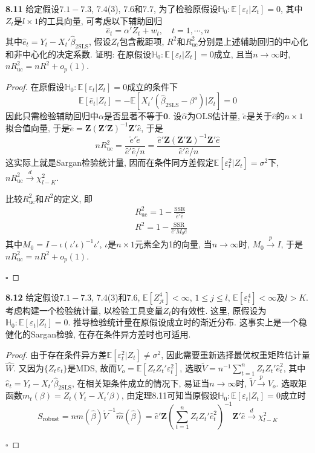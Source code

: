 \documentclass[cn,12pt,math=mtpro2,citestyle=gb7714-2015,bibstyle=gb7714-2015,twocol,mode=simple]{elegantbook}
\newcommand{\HH}{\mathbb{H}}
\newcommand{\E}{\mathbb{E}}
\newcommand{\hbeta}{\hat{\beta}}
\newcommand{\btls}{\hat{\beta}_{\text{2SLS}}}
\newcommand{\hatm}{\hat{m}}
\begin{document}
\textbf{8.11} 给定假设$7.1-7.3$, 7.4(3), 7.6和7.7, 为了检验原假设$\HH_0: \E[\varepsilon_t|Z_t]=0$, 其中$Z_t$是$l\times1$的工具向量, 可考虑以下辅助回归
$$\hat{e}_t=\alpha'Z_t+w_t,\quad t=1,\cdots,n$$
其中$\hat{e}_t=Y_t-X_t'\btls$, 假设$Z_t$包含截距项, $R^2$和$R_{\text{uc}}^2$分别是上述辅助回归的中心化和非中心化的决定系数. 证明: 在原假设$\HH_0: \E[\varepsilon_t|Z_t]=0$成立, 且当$n\to\infty$时, $nR_{\text{uc}}^2=nR^2+o_p(1)$.

\begin{proof}
  在原假设$\HH_0:\E[\varepsilon_t|Z_t]=0$成立的条件下
  $$\E[\hat{e}_t|Z_t]=-\E[X_t'(\btls-\beta^o)|Z_t]=0$$
  因此只需检验辅助回归中$\alpha$是否显著不等于$\mathbf{0}$. 设$\hat{\alpha}$为OLS估计量, $\tilde{e}$是关于$\hat{e}$的$n\times 1$拟合值向量, 于是$\tilde{e}=\mathbf{Z}(\mathbf{Z}'\mathbf{Z})^{-1}\mathbf{Z}'\hat{e}$, 于是
  $$nR_{\text{uc}}^2=\frac{\tilde{e}'\tilde{e}}{\hat{e}'\hat{e}/n}=\frac{\hat{e}'\mathbf{Z}(\mathbf{Z}'\mathbf{Z})^{-1}\mathbf{Z}'\hat{e}}{\hat{e}'\hat{e}/n}$$
  这实际上就是Sargan检验统计量, 因而在条件同方差假定$\E[\varepsilon_t^2|Z_t]=\sigma^2$下, $nR_{\text{uc}}^2\xrightarrow{d}\chi^2_{l-K}$.

  比较$R_{\text{uc}}^2$和$R^2$的定义, 即
  \begin{align*}
  &R_{\text{uc}}^2=1-\frac{\text{SSR}}{\hat{e}'\hat{e}} \\
  &R^2=1-\frac{\text{SSR}}{\hat{e}'M_0\hat{e}}
  \end{align*}
  其中$M_0=I-\iota(\iota'\iota)^{-1}\iota'$, $\iota$是$n\times 1$元素全为1的向量, 当$n\to\infty$时, $M_0\xrightarrow{p} I$, 于是$nR_{\text{uc}}^2=nR^2+o_p(1)$.

  $\square$
\end{proof}

\textbf{8.12} 给定假设$7.1-7.3$, 7.4(3)和7.6, $\E[Z_{jt}^4]<\infty$, $1\leq j\leq l$, $\E[\varepsilon_t^4]<\infty$及$l>K$. 考虑构建一个检验统计量, 以检验工具变量$Z_t$的有效性. 这里, 原假设为$\HH_0:\E[\varepsilon_t|Z_t]=0$. 推导检验统计量在原假设成立时的渐近分布. 这事实上是一个稳健化的Sargan检验, 在存在条件异方差时也可适用.

\begin{proof}
  由于存在条件异方差$\E[\varepsilon_t^2|Z_t]\neq\sigma^2$, 因此需要重新选择最优权重矩阵估计量$\hat{W}$. 又因为$\{Z_t\varepsilon_t\}$是MDS, 故而$V_o=\E[Z_tZ_t'\varepsilon_t^2]$, 选取$\tilde{V}=n^{-1}\displaystyle\sum_{t=1}^{n}Z_tZ_t'\hat{e}_t^2$, 其中$\hat{e}_t=Y_t-X_t'\btls$, 在相关矩条件成立的情况下, 易证当$n\to\infty$时, $\tilde{V}\xrightarrow{p}V_o$. 选取矩函数$m_t(\beta)=Z_t(Y_t-X_t'\beta)$, 由定理8.11可知当原假设$\HH_0:\E[\varepsilon_t|Z_t]=0$成立时
  $$S_{\text{robust}}=n\hat{m}(\hbeta)\tilde{V}^{-1}\hatm(\hbeta)=\hat{e}'\mathbf{Z}\left(\sum_{t=1}^{n}Z_tZ_t'\hat{e}_t^2\right)^{-1}\mathbf{Z}'\hat{e}\xrightarrow{d}\chi_{l-K}^2$$

  $\square$
\end{proof}
\end{document}
